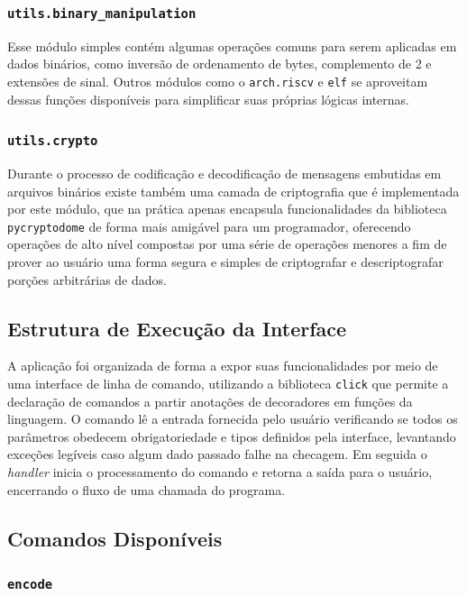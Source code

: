 \subsubsection{\texttt{utils.binary\_manipulation}}

Esse módulo simples contém algumas operações comuns para serem aplicadas em dados binários, como inversão de ordenamento de bytes, complemento de 2 e extensões de sinal. Outros módulos como o \texttt{arch.riscv} e \texttt{elf} se aproveitam dessas funções disponíveis para simplificar suas próprias lógicas internas.

\subsubsection{\texttt{utils.crypto}}

Durante o processo de codificação e decodificação de mensagens embutidas em arquivos binários existe também uma camada de criptografia que é implementada por este módulo, que na prática apenas encapsula funcionalidades da biblioteca \texttt{pycryptodome} de forma mais amigável para um programador, oferecendo operações de alto nível compostas por uma série de operações menores a fim de prover ao usuário uma forma segura e simples de criptografar e descriptografar porções arbitrárias de dados.

\subsection{Estrutura de Execução da Interface}

A aplicação foi organizada de forma a expor suas funcionalidades por meio de uma interface de linha de comando, utilizando a biblioteca \texttt{click} que permite a declaração de comandos a partir anotações de decoradores em funções da linguagem. O comando lê a entrada fornecida pelo usuário verificando se todos os parâmetros obedecem obrigatoriedade e tipos definidos pela interface, levantando exceções legíveis caso algum dado passado falhe na checagem. Em seguida o \textit{handler} inicia o processamento do comando e retorna a saída para o usuário, encerrando o fluxo de uma chamada do programa.

\subsection{Comandos Disponíveis}

\subsubsection{\texttt{encode}}

